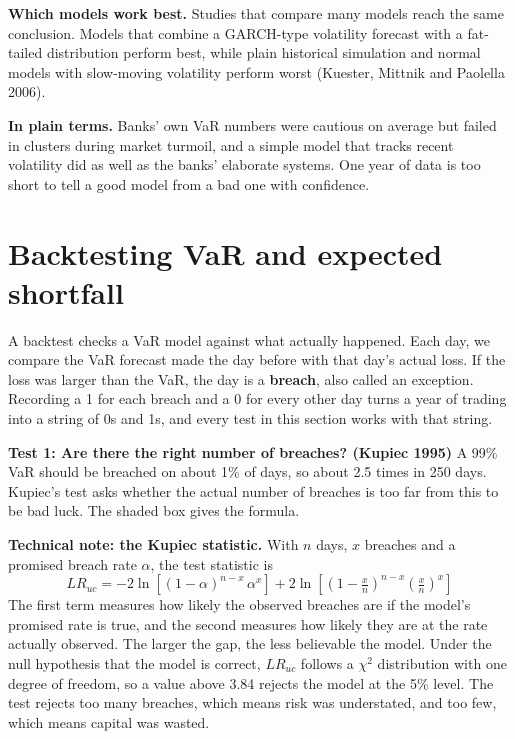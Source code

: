 \textbf{Which models work best.} Studies that compare many models reach the same conclusion. Models that combine a GARCH-type volatility forecast with a fat-tailed distribution perform best, while plain historical simulation and normal models with slow-moving volatility perform worst (Kuester, Mittnik and Paolella 2006).

\noindent\textbf{In plain terms.} Banks' own VaR numbers were cautious on average but failed in clusters during market turmoil, and a simple model that tracks recent volatility did as well as the banks' elaborate systems. One year of data is too short to tell a good model from a bad one with confidence.

\section{Backtesting VaR and expected shortfall}
\label{sec:11-backtest}

A backtest checks a VaR model against what actually happened. Each day, we compare the VaR forecast made the day before with that day's actual loss. If the loss was larger than the VaR, the day is a \textbf{breach}, also called an exception. Recording a 1 for each breach and a 0 for every other day turns a year of trading into a string of 0s and 1s, and every test in this section works with that string.

\textbf{Test 1: Are there the right number of breaches? (Kupiec 1995)} A 99\% VaR should be breached on about 1\% of days, so about 2.5 times in 250 days. Kupiec's test asks whether the actual number of breaches is too far from this to be bad luck. The shaded box gives the formula.

\begin{technote}
\textbf{Technical note: the Kupiec statistic.} With $n$ days, $x$ breaches and a promised breach rate $\alpha$, the test statistic is
\begin{equation}
  LR_{uc} = -2\ln\!\left[(1 - \alpha)^{n-x}\,\alpha^{x}\right] + 2\ln\!\left[\left(1 - \tfrac{x}{n}\right)^{n-x}\left(\tfrac{x}{n}\right)^{x}\right]
  \label{eq:11-kupiec}
\end{equation}
The first term measures how likely the observed breaches are if the model's promised rate is true, and the second measures how likely they are at the rate actually observed. The larger the gap, the less believable the model. Under the null hypothesis that the model is correct, $LR_{uc}$ follows a $\chi^2$ distribution with one degree of freedom, so a value above 3.84 rejects the model at the 5\% level. The test rejects too many breaches, which means risk was understated, and too few, which means capital was wasted.
\end{technote}

